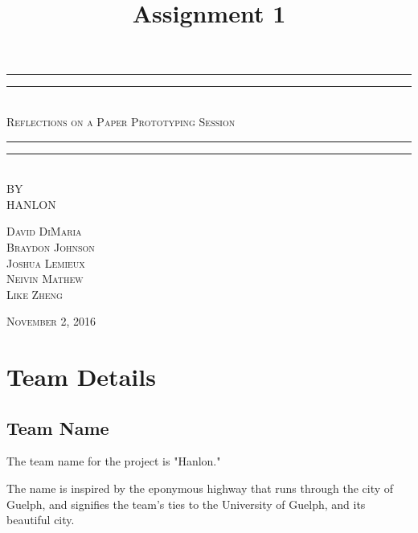 \documentclass[12pt,letterpaper]{article}
\title{Assignment 1}
\begin{document}
\begin{titlepage}
    \centering
    \vspace*{\baselineskip}
    \rule{\textwidth}{1.6pt}\vspace*{-\baselineskip}\vspace*{2pt}
    \rule{\textwidth}{0.4pt}\\[1.5\baselineskip]
    {\LARGE \textsc{Reflections on a Paper Prototyping Session}}\\[\baselineskip]
	\rule{\textwidth}{0.4pt}\vspace*{-\baselineskip}\vspace{4pt}    
    \rule{\textwidth}{2pt}\\[2\baselineskip]
   
    \vspace*{5\baselineskip}
    \textsc{BY}\\[0.25\baselineskip]
    {\LARGE HANLON} \\
    
    \vspace*{\baselineskip}
    {\textsc{David DiMaria \\ Braydon Johnson \\ Joshua Lemieux \\ Neivin Mathew \\ Like Zheng} \par}
    \vfill
    {\scshape November 2, 2016} \\
  \end{titlepage}
  
  
\tableofcontents
\lhead{} %
\clearpage
{} %
    
\clearpage
\section{Team Details}
\subsection{Team Name}
The team name for the project is "Hanlon."\par
The name is inspired by the eponymous highway that runs through the city of Guelph, and signifies the team's ties to the University of Guelph, and its beautiful city.\\
\end{document}
